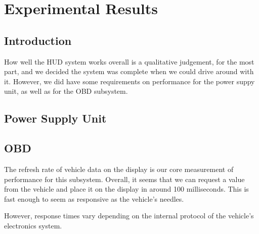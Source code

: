 \chapter{Experimental Results}


\section{Introduction}

How well the HUD system works overall is a qualitative judgement, for the most
part, and we decided the system was complete when we could drive around with it.
However, we did have some requirements on performance for the power suppy unit, as well
as for the OBD subsystem.

\section{Power Supply Unit}


\section{OBD}

The refresh rate of vehicle data on the display is our core measurement of
performance for this subsystem. Overall, it seems that we can request a value
from the vehicle and place it on the display in around 100 milliseconds. This
is fast enough to seem as responsive as the vehicle's needles.

However, response times vary depending on the internal protocol of the vehicle's
electronics system.